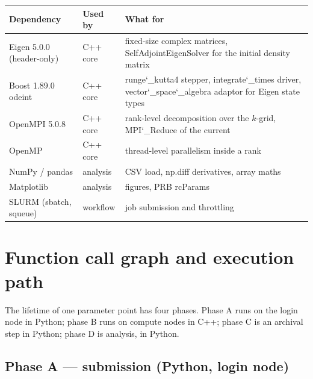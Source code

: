 \documentclass[11pt,a4paper]{article}
\newcommand{\brk}{\discretionary{}{}{}}
\newcommand{\uu}{\char`_\brk}
\newcommand{\fn}[1]{{\ttfamily #1}}
\begin{document}
\begin{center}
\scriptsize
\begin{tabular}{@{}L{0.20\textwidth} L{0.22\textwidth} L{0.50\textwidth}@{}}
\toprule
\textbf{Dependency} & \textbf{Used by} & \textbf{What for} \\
\midrule
Eigen 5.0.0 (header-only)   & C++ core   & fixed-size complex matrices, \fn{SelfAdjointEigenSolver} for the initial density matrix \\
Boost 1.89.0 \fn{odeint}    & C++ core   & \fn{runge\uu kutta4} stepper, \fn{integrate\uu times} driver, \fn{vector\uu space\uu algebra} adaptor for Eigen state types \\
OpenMPI 5.0.8               & C++ core   & rank-level decomposition over the $k$-grid, \fn{MPI\uu Reduce} of the current \\
OpenMP                      & C++ core   & thread-level parallelism inside a rank \\
NumPy / pandas              & analysis   & CSV load, \fn{np.diff} derivatives, array maths \\
Matplotlib                  & analysis   & figures, PRB \fn{rcParams} \\
SLURM (\fn{sbatch}, \fn{squeue}) & workflow & job submission and throttling \\
\bottomrule
\end{tabular}
\end{center}

\section{Function call graph and execution path}\label{sec:call}

The lifetime of one parameter point has four phases. Phase A runs on the login
node in Python; phase B runs on compute nodes in C++; phase C is an archival
step in Python; phase D is analysis, in Python.

\subsection{Phase A --- submission (Python, login node)}
\end{document}
